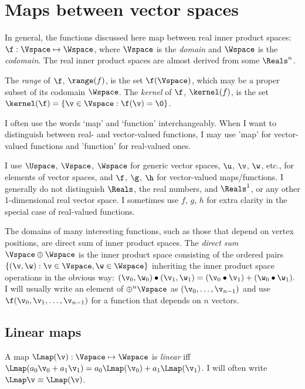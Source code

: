 
\section{Maps between vector spaces}
\label{sec:maps}

In general, the functions discussed here map between real inner product spaces:
$\f:\Vspace \mapsto \Wspace$, where $\Vspace$ is the
{\it domain} and $\Wspace$ is the {\it codomain}.
The real inner product spaces are almost derived from some $\Reals^n$.

The {\it range} of $\f$, $\range(f)$, is the set $\f(\Vspace)$,
which may be a proper subset of its codomain $\Wspace$.
The {\it kernel} of $\f$, $\kernel(f)$, is the set
$\kernel(\f) = \{ \v \in \Vspace : \f(\v) = \0 \}$.

I often use the words `map' and `function' interchangeably.
When I want to distinguish between real- and vector-valued functions,
I may use 'map' for vector-valued functions and
'function' for real-valued ones.

I use $\Uspace$, $\Vspace$, $\Wspace$ for generic vector spaces,
$\u$, $\v$, $\w$, etc., for elements of vector spaces,
and
$\f$, $\g$, $\h$ for vector-valued maps/functions.
I generally do not distinguish $\Reals$, the real numbers,
and $\Reals^1$, or any other 1-dimensional real vector space.
I sometimes use $f$, $g$, $h$ for extra clarity in the special
case of real-valued functions.

The domains of many interesting functions,
such as those that depend on vertex positions,
are direct sum of inner product spaces.
The {\it direct sum} $\Vspace \oplus \Wspace$ is the inner product space
consisting of the ordered pairs $\{ (\v,\w) : \v \in \Vspace, \w \in \Wspace \}$
inheriting the inner product space operations in the obvious way:
$(\v_0,\w_0) \bullet (\v_1,\w_1) = (\v_0 \bullet \v_1) + (\w_0 \bullet \w_1).$
I will usually write an element of $\oplus^n \Vspace$ as
$(\v_0,\ldots,\v_{n-1})$
and use
$\f(\v_0,\v_1,\ldots,\v_{n-1})$
for a function that depends on $n$ vectors.


\subsection{Linear maps}
\label{sec:linear-maps}

A map $\Lmap(\v):\Vspace \mapsto \Wspace$
is {\it linear} iff
$\Lmap(a_0 \v_0 + a_1 \v_1) = a_0 \Lmap(\v_0) + a_1 \Lmap(\v_1)$.
I will often write $\Lmap\v \equiv \Lmap(\v)$.

